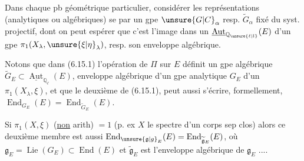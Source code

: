Dans chaque pb géométrique particulier,  considérer les représentations (analytiques ou algébriques) se  par un gpe  $\unsure{G|C}_\alpha$ resp. $\widetilde G_\alpha$ fixé du syst. projectif, dont on peut espérer que c'est l'image dans un $\underline{\operatorname{Aut}}_{\mathbb{Q}_{\unsure{\ell|l}}}(E)$ d'un gpe $\pi_1(X_\lambda,\unsure{\xi|\eta}_\lambda)$, resp. son enveloppe algébrique.

Notons que  dans (6.15.1) l'opération de $\Pi$ sur $E$ définit un gpe algébrique $\widetilde G_E\subset\underline{\operatorname{Aut}}_{\mathbb{Q}_\ell}(E)$, enveloppe algébrique d'un gpe analytique $G_E$   d'un $\pi_1(X_\lambda,\xi)$, et que le deuxième  de (6.15.1), peut aussi s'écrire,  formellement, $\operatorname{End}_{G_E}(E)=\operatorname{End}_{\widetilde G_E}(E)$.

Si $\pi_1(X,\xi)$ (\uline{non} arith) $=1$ (p. ex $X$ le spectre d'un corps sep clos) alors ce deuxième membre est aussi $\operatorname{End}_{\unsure{\mathfrak g|g}_E}(E)=\operatorname{End}_{\widetilde{\mathfrak g}_E}(E)$, où $\mathfrak g_E=\operatorname{Lie}(G_E)\subset\operatorname{End}(E)$ et $\widetilde{\mathfrak g}_E$ est l'enveloppe algébrique de $\mathfrak g_E$ ....
